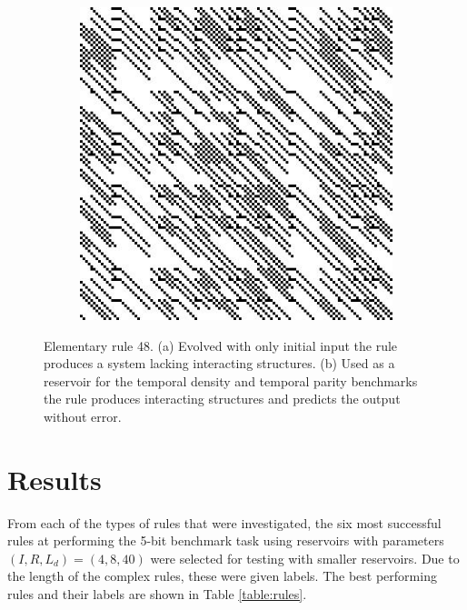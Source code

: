\documentclass{elsarticle}
\begin{document}
\begin{multicols}{2}
\begin{figure}[H]
\begin{subfigure}[]{0.475\linewidth}
  \caption{}
  \end{subfigure}
\begin{subfigure}[]{0.475\linewidth}
  \includegraphics[width=\linewidth]{rule48_reservoir.jpg}
  \caption{}
  \end{subfigure}
  \caption{Elementary rule 48. (a) Evolved with only initial input the rule 
     produces a system lacking interacting structures. (b) Used as a reservoir 
        for the temporal density and temporal parity benchmarks the rule 
           produces interacting structures and predicts the output without 
              error.}
     \label{rule48}
     \end{figure}

\section{Results}\label{results}
From each of the types of rules that were investigated, the six most successful 
   rules at performing the 5-bit benchmark task using reservoirs with 
   parameters $(I, R, L_{d}) = (4, 8, 40)$ were selected for testing with 
   smaller  reservoirs. Due to the length of the complex rules, these were 
   given labels.  The best performing rules and their labels are shown in Table
\ref{table:rules}. \par 



\end{multicols}
\end{document}
